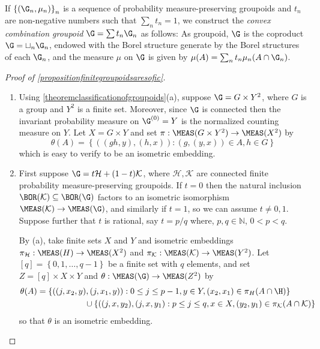 \begin{definition}
If $\left\{(\G_n,\mu_n)\right\}_n$ is a sequence of probability measure-preserving groupoids and $t_n$ are non-negative numbers such that $\sum_n t_n=1$, we construct the \emph{convex combination groupoid} $\G=\sum t_n\G_n$ as follows: As groupoid, $\G$ is the coproduct $\G=\sqcup_n\G_n$, endowed with the Borel structure generate by the Borel structures of each $\G_n$, and the measure $\mu$ on $\G$ is given by $\mu(A)=\sum_n t_n\mu_n(A\cap\G_n)$.
\end{definition}

\begin{proof}[Proof of \ref{propositionfinitegroupoidsaresofic}]
\begin{enumerate}
\item[(a)] Using \ref{theoremclassificationofgroupoids}(a), suppose $\G=G\times Y^2$, where $G$ is a group and $Y^2$ is a finite set. Moreover, since $\G$ is connected then the invariant probability measure on $\G^{(0)}=Y$ is the normalized counting measure on $Y$. Let $X=G\times Y$ and set $\pi:\MEAS(G\times Y^2)\to\MEAS(X^2)$ by
\[\theta(A)=\left\{((gh,y),(h,x)):(g,(y,x))\in A,h\in G\right\}\]
which is easy to verify to be an isometric embedding.
%
\item[(b)] First suppose $\G=t\mathcal{H}+(1-t)\mathcal{K}$, where $\mathcal{H},\mathcal{K}$ are connected finite probability measure-preserving groupoids. If $t=0$ then the natural inclusion $\BOR(\mathcal{K})\subseteq\BOR(\G)$ factors to an isometric isomorphism $\MEAS(\mathcal{K})\to\MEAS(\G)$, and similarly if $t=1$, so we can assume $t\neq 0,1$. Suppose further that $t$ is rational, say $t=p/q$ where, $p,q\in\mathbb{N}$, $0<p<q$.

By (a), take finite sets $X$ and $Y$ and isometric embeddings $\pi_\mathcal{H}:\MEAS(H)\to\MEAS(X^2)$ and $\pi_\mathcal{K}:\MEAS(\mathcal{K})\to\MEAS(Y^2)$. Let $[q]=\left\{0,1,\ldots,q-1\right\}$ be a finite set with $q$ elements, and set $Z=[q]\times X\times Y$ and $\theta:\MEAS(\G)\to\MEAS(Z^2)$ by
\begin{align*}
\theta(A)&=\left\{((j,x_2,y),(j,x_1,y)):0\leq j\leq p-1,y\in Y,(x_2,x_1)\in\pi_H(A\cap \H)\right\}\\
&\hspace{2cm}\cup\left\{((j,x,y_2),(j,x,y_1):p\leq j\leq q, x\in X, (y_2,y_1)\in \pi_\mathcal{K}(A\cap\mathcal{K})\right\}
\end{align*}
so that $\theta$ is an isometric embedding.


\end{enumerate}
\end{proof}
